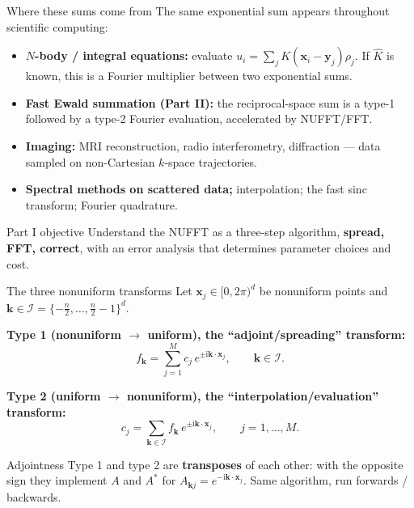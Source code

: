 \documentclass[aspectratio=169,11pt]{beamer}
\newcommand{\ii}{\mathrm i}
\newcommand{\x}{\bm{x}}
\newcommand{\y}{\bm{y}}
\newcommand{\kk}{\bm{k}}
\newcommand{\hl}[1]{{\color{CCMorange}\textbf{#1}}}
\begin{document}
\begin{frame}{Where these sums come from}
\small
The same exponential sum appears throughout scientific computing:
\begin{itemize}
  \item \hl{$N$-body / integral equations:} evaluate \(\displaystyle u_i=\sum_j K(\x_i-\y_j)\rho_j\).  If \(\widehat K\) is known, this is a Fourier multiplier between two exponential sums.
  \item \hl{Fast Ewald summation (Part II):} the reciprocal-space sum is a
  type-1 followed by a type-2 Fourier evaluation, accelerated by NUFFT/FFT.
  \item \hl{Imaging:} MRI reconstruction, radio interferometry, diffraction --- data sampled on non-Cartesian $k$-space trajectories.
  \item \hl{Spectral methods on scattered data;} interpolation; the fast sinc transform; Fourier quadrature.
\end{itemize}
\vspace{1mm}
\begin{block}{Part I objective}
Understand the NUFFT as a three-step algorithm, \hl{spread, FFT, correct},
with an error analysis that determines parameter choices and cost.
\end{block}
\end{frame}

\begin{frame}{The three nonuniform transforms}
\small
Let \(\x_j\in[0,2\pi)^d\) be nonuniform points and \(\kk\in\mathcal I=\{-\tfrac{n}{2},\dots,\tfrac n2-1\}^d\).

\vspace{1mm}
\hl{Type 1 (nonuniform \(\to\) uniform), the ``adjoint/spreading'' transform:}
\[
  f_{\kk}=\sum_{j=1}^{M} c_j\, e^{\pm \ii \kk\cdot \x_j},\qquad \kk\in\mathcal I .
\]

\hl{Type 2 (uniform \(\to\) nonuniform), the ``interpolation/evaluation'' transform:}
\[
  c_j=\sum_{\kk\in\mathcal I} f_{\kk}\, e^{\pm \ii \kk\cdot \x_j},\qquad j=1,\dots,M .
\]

\begin{block}{Adjointness}
Type 1 and type 2 are \hl{transposes} of each other: with the opposite sign they implement \(A\) and \(A^{*}\) for \(A_{\kk j}=e^{-\ii\kk\cdot\x_j}\). Same algorithm, run forwards / backwards.
\end{block}
\end{frame}
\end{document}
